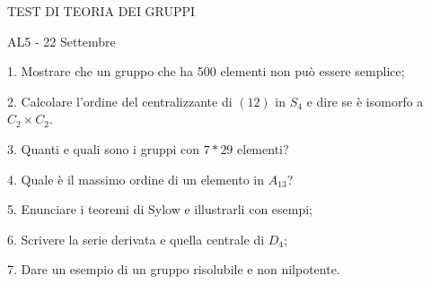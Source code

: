 
\centerline{TEST DI TEORIA DEI GRUPPI}
\centerline{AL5 - 22 Settembre}

\item{1.} Mostrare che un gruppo che ha 500 elementi
non pu\`o essere semplice;
\bigskip

\item{2.} Calcolare l'ordine del centralizzante di $(1 2)$
in $S_4$ e dire se \`e isomorfo a $C_2\times C_2$.
\bigskip

\item{3.} Quanti e quali sono i gruppi con $7*29$ elementi?
\bigskip

\item{4.} Quale \`e il massimo ordine di un elemento in $A_{13}$?
\bigskip

\item{5.} Enunciare i teoremi di Sylow e illustrarli con esempi;
\bigskip

\item{6.} Scrivere la serie derivata e quella centrale di $D_4$;
\bigskip

\item{7.} Dare un esempio di un gruppo risolubile e non nilpotente. 


\bye
